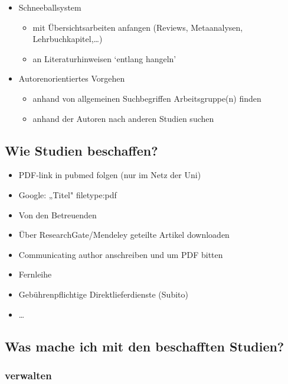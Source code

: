 \documentclass[
]{book}
\providecommand{\tightlist}{%
  \setlength{\itemsep}{0pt}\setlength{\parskip}{0pt}}
\begin{document}
\begin{itemize}
\item
  Schneeballsystem

  \begin{itemize}
  \tightlist
  \item
    mit Übersichtsarbeiten anfangen (Reviews, Metaanalysen, Lehrbuchkapitel,\ldots)
  \item
    an Literaturhinweisen `entlang hangeln'
  \end{itemize}
\item
  Autorenorientiertes Vorgehen

  \begin{itemize}
  \tightlist
  \item
    anhand von allgemeinen Suchbegriffen Arbeitsgruppe(n) finden
  \item
    anhand der Autoren nach anderen Studien suchen
  \end{itemize}
\end{itemize}

\hypertarget{wie-studien-beschaffen}{%
\subsection{Wie Studien beschaffen?}\label{wie-studien-beschaffen}}

\begin{itemize}
\tightlist
\item
  PDF-link in pubmed folgen (nur im Netz der Uni)
\item
  Google: „Titel" filetype:pdf
\item
  Von den Betreuenden
\item
  Über ResearchGate/Mendeley geteilte Artikel downloaden
\item
  Communicating author anschreiben und um PDF bitten
\item
  Fernleihe
\item
  Gebührenpflichtige Direktlieferdienste (Subito)
\item
  \ldots{}
\end{itemize}

\hypertarget{was-mache-ich-mit-den-beschafften-studien}{%
\subsection{Was mache ich mit den beschafften Studien?}\label{was-mache-ich-mit-den-beschafften-studien}}

\hypertarget{verwalten}{%
\subsubsection{verwalten}\label{verwalten}}
\end{document}
